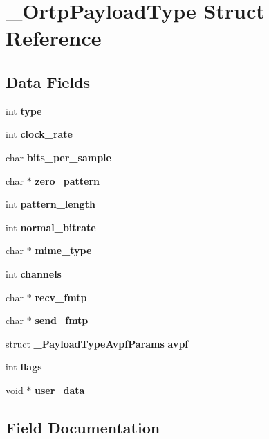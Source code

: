 \section{\+\_\+\+Ortp\+Payload\+Type Struct Reference}
\label{struct__OrtpPayloadType}
\subsection*{Data Fields}
\begin{DoxyCompactItemize}
\item 
int \textbf{ type}
\item 
int \textbf{ clock\+\_\+rate}
\item 
\mbox{\label{struct__OrtpPayloadType_a2fa8198a95a8fbd7f90b96aa05510454}} 
char {\bfseries bits\+\_\+per\+\_\+sample}
\item 
\mbox{\label{struct__OrtpPayloadType_a70863f62bea3eda071265b8d614de293}} 
char $\ast$ {\bfseries zero\+\_\+pattern}
\item 
\mbox{\label{struct__OrtpPayloadType_ae583f7613c1ab46e823ba2cdd3717f0d}} 
int {\bfseries pattern\+\_\+length}
\item 
\mbox{\label{struct__OrtpPayloadType_a2df08deb22028a17d0f6edc6baf22f05}} 
int {\bfseries normal\+\_\+bitrate}
\item 
char $\ast$ \textbf{ mime\+\_\+type}
\item 
int \textbf{ channels}
\item 
\mbox{\label{struct__OrtpPayloadType_a2fe78d9559d2a738c3e898d88ceafd79}} 
char $\ast$ {\bfseries recv\+\_\+fmtp}
\item 
\mbox{\label{struct__OrtpPayloadType_a095e85e7f09e44b3c0de9b6334c9eea9}} 
char $\ast$ {\bfseries send\+\_\+fmtp}
\item 
\mbox{\label{struct__OrtpPayloadType_a725d6fb741e6943f0049f20998257171}} 
struct \textbf{ \+\_\+\+Payload\+Type\+Avpf\+Params} {\bfseries avpf}
\item 
\mbox{\label{struct__OrtpPayloadType_a3c53ee19e610a9c1fdefb8eb334a590d}} 
int {\bfseries flags}
\item 
\mbox{\label{struct__OrtpPayloadType_a71de6980ac7689ab9528fc810dacc641}} 
void $\ast$ {\bfseries user\+\_\+data}
\end{DoxyCompactItemize}


\subsection{Field Documentation}
\mbox{\label{struct__OrtpPayloadType_ac5381077d9a9c0ac2b2209d9a73cf924}} 
